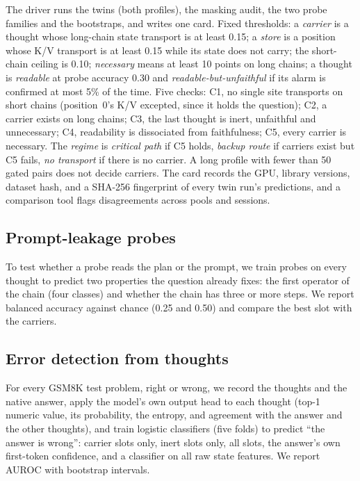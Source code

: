 \documentclass{article}
\begin{document}
The driver runs the twins (both profiles), the masking audit, the two probe families and the bootstraps, and writes one card. Fixed thresholds: a \emph{carrier} is a thought whose long-chain state transport is at least 0.15; a \emph{store} is a position whose K/V transport is at least 0.15 while its state does not carry; the short-chain ceiling is 0.10; \emph{necessary} means at least 10 points on long chains; a thought is \emph{readable} at probe accuracy 0.30 and \emph{readable-but-unfaithful} if its alarm is confirmed at most 5\% of the time. Five checks: C1, no single site transports on short chains (position~0's K/V excepted, since it holds the question); C2, a carrier exists on long chains; C3, the last thought is inert, unfaithful and unnecessary; C4, readability is dissociated from faithfulness; C5, every carrier is necessary. The \emph{regime} is \emph{critical path} if C5 holds, \emph{backup route} if carriers exist but C5 fails, \emph{no transport} if there is no carrier. A long profile with fewer than 50 gated pairs does not decide carriers. The card records the GPU, library versions, dataset hash, and a SHA-256 fingerprint of every twin run's predictions, and a comparison tool flags disagreements across pools and sessions.

\subsection{Prompt-leakage probes}\label{sec:leakage-method}

To test whether a probe reads the plan or the prompt, we train probes on every thought to predict two properties the question already fixes: the first operator of the chain (four classes) and whether the chain has three or more steps. We report balanced accuracy against chance (0.25 and 0.50) and compare the best slot with the carriers.

\subsection{Error detection from thoughts}\label{sec:errdet-method}

For every GSM8K test problem, right or wrong, we record the thoughts and the native answer, apply the model's own output head to each thought (top-1 numeric value, its probability, the entropy, and agreement with the answer and the other thoughts), and train logistic classifiers (five folds) to predict ``the answer is wrong'': carrier slots only, inert slots only, all slots, the answer's own first-token confidence, and a classifier on all raw state features. We report AUROC with bootstrap intervals.
\end{document}
